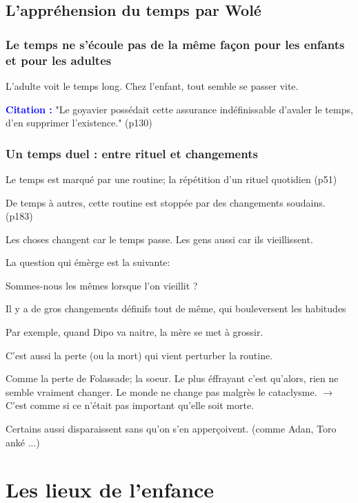 \documentclass[a4paper, 11pt, hidelinks]{article}
\newcommand{\bs}{\bigskip}
\newcommand{\cit}{\large \textcolor{blue}{\textbf{Citation :}} \large }
\begin{document}
\subsection{L'appréhension du temps par Wolé}


\subsubsection{Le temps ne s'écoule pas de la même façon pour les enfants et pour les adultes}


L'adulte voit le temps long. Chez l'enfant, tout semble se passer vite.


\cit "Le goyavier possédait cette assurance indéfinissable d'avaler le temps, d'en supprimer l'existence." (p130)


\subsubsection{Un temps duel : entre rituel et changements}


Le temps est marqué par une routine; la répétition d'un rituel quotidien (p51)

\bs

De temps à autres, cette routine est stoppée par des changements soudains. (p183)


Les choses changent car le temps passe. Les gens aussi car ils vieillissent.

La question qui émèrge est la suivante:

Sommes-nous les mêmes lorsque l'on vieillit ?
\bs


Il y a de gros changements définifs tout de même, qui bouleversent les habitudes 


Par exemple, quand Dipo va naitre, la mère se met à grossir. 


C'est aussi la perte (ou la mort) qui vient perturber la routine.

Comme la perte de Folassade; la soeur. Le plus éffrayant c'est qu'alors, rien ne semble vraiment changer. Le monde
ne change pas malgrès le cataclysme. $\to$ C'est comme si ce n'était pas important qu'elle soit morte.


Certains aussi disparaissent sans qu'on s'en apperçoivent. (comme Adan, Toro anké ...)



\section{Les lieux de l'enfance}
\end{document}

